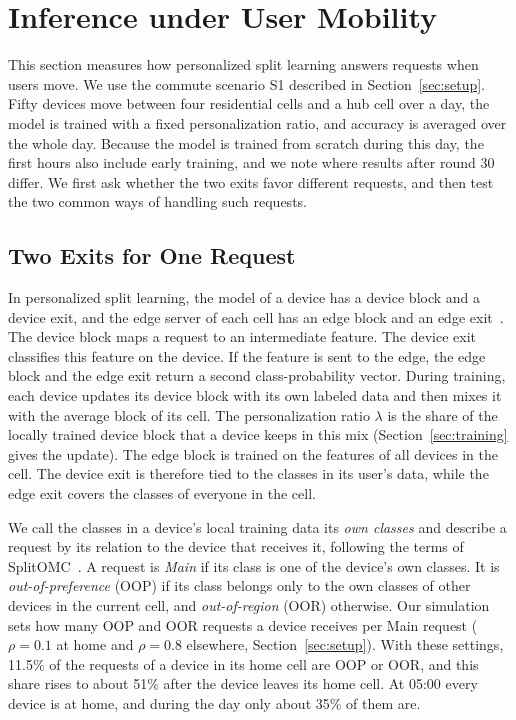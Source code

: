 \section{Inference under User Mobility}
\label{sec:motivation}

This section measures how personalized split learning answers requests when users move. We use the commute scenario S1 described in Section~\ref{sec:setup}. Fifty devices move between four residential cells and a hub cell over a day, the model is trained with a fixed personalization ratio, and accuracy is averaged over the whole day. Because the model is trained from scratch during this day, the first hours also include early training, and we note where results after round 30 differ. We first ask whether the two exits favor different requests, and then test the two common ways of handling such requests.

\subsection{Two Exits for One Request}
\label{sec:two_exits}

In personalized split learning, the model of a device has a device block and a device exit, and the edge server of each cell has an edge block and an edge exit~\cite{han2023splitgp,rizwan2026splitomc}. The device block maps a request to an intermediate feature. The device exit classifies this feature on the device. If the feature is sent to the edge, the edge block and the edge exit return a second class-probability vector. During training, each device updates its device block with its own labeled data and then mixes it with the average block of its cell. The personalization ratio $\lambda$ is the share of the locally trained device block that a device keeps in this mix (Section~\ref{sec:training} gives the update). The edge block is trained on the features of all devices in the cell. The device exit is therefore tied to the classes in its user's data, while the edge exit covers the classes of everyone in the cell.

We call the classes in a device's local training data its \emph{own classes} and describe a request by its relation to the device that receives it, following the terms of SplitOMC~\cite{rizwan2026splitomc}. A request is \emph{Main} if its class is one of the device's own classes. It is \emph{out-of-preference} (OOP) if its class belongs only to the own classes of other devices in the current cell, and \emph{out-of-region} (OOR) otherwise. Our simulation sets how many OOP and OOR requests a device receives per Main request ($\rho=0.1$ at home and $\rho=0.8$ elsewhere, Section~\ref{sec:setup}). With these settings, 11.5\% of the requests of a device in its home cell are OOP or OOR, and this share rises to about 51\% after the device leaves its home cell. At 05:00 every device is at home, and during the day only about 35\% of them are.

